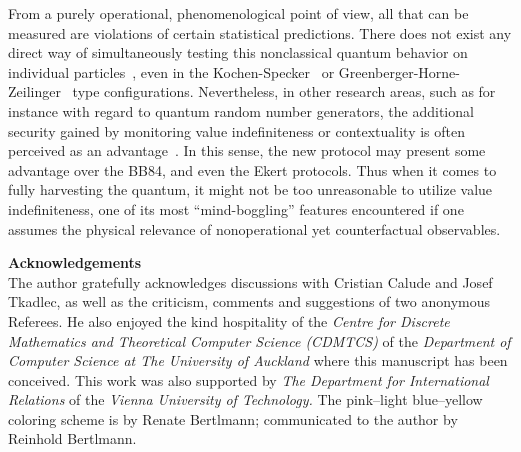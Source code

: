 \documentclass[%
 preprint,
 showpacs,
 showkeys,
 preprintnumbers,
 amsmath,amssymb,
 aps,
 pra,
  longbibliography,
 ]{revtex4-1}
\begin{document}
From a purely operational,  phenomenological point of view, all that can be measured are violations of certain statistical predictions.
There does not exist any direct way of simultaneously testing
this nonclassical quantum behavior on individual particles~\cite{svozil-2006-uniquenessprinciple},
even in the
Kochen-Specker~\cite{cabello:210401,kirch-09}
or Greenberger-Horne-Zeilinger~\cite{ghz,panbdwz} type configurations.
Nevertheless, in other research areas, such as for instance with regard to quantum random number generators, the additional security gained by monitoring value indefiniteness or
contextuality is often perceived as an advantage~\cite{PhysRevLett.85.3313,2008-cal-svo,svozil-2009-howto,10.1038/nature09008}.
In this sense, the new protocol may present some advantage over the BB84, and even the Ekert protocols.
Thus when it comes to fully  harvesting  the quantum, it might not be too unreasonable to utilize value indefiniteness,
one of its most ``mind-boggling'' features encountered if one assumes the physical relevance of nonoperational yet counterfactual observables.







$\;$\\
{\bf Acknowledgements}
\\
The author gratefully acknowledges discussions with Cristian Calude and Josef Tkadlec, as well as the criticism, comments and suggestions of two anonymous Referees.
He also enjoyed the kind hospitality of the {\it Centre for Discrete Mathematics
and Theoretical Computer Science (CDMTCS)} of the {\it Department of Computer Science at
The University of Auckland} where this manuscript has been conceived.
This work was also supported by {\it The Department for International Relations}
of the {\em Vienna University of Technology.}
The pink--light blue--yellow coloring scheme is by Renate Bertlmann; communicated to the author by Reinhold Bertlmann.



\end{document}
